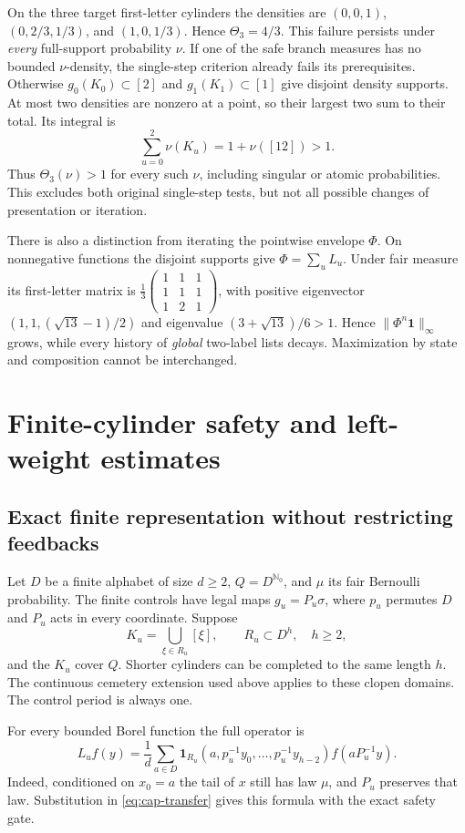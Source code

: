 \documentclass[11pt,reqno]{amsart}
\numberwithin{equation}{section}
\theoremstyle{definition}
\newcommand{\Nzero}{\mathbb N_0}
\newcommand{\one}{\mathbf 1}
\begin{document}
On the three target first-letter cylinders the densities are
$(0,0,1)$, $(0,2/3,1/3)$, and $(1,0,1/3)$.
Hence $\Theta_3=4/3$. This failure persists under \emph{every}
full-support probability $\nu$. If one of the safe branch measures
has no bounded $\nu$-density, the single-step criterion already
fails its prerequisites. Otherwise $g_0(K_0)\subset[2]$ and
$g_1(K_1)\subset[1]$ give disjoint density supports. At most two
densities are nonzero at a point, so their largest two sum to their
total. Its integral is
\[
 \sum_{u=0}^2\nu(K_u)=1+\nu([12])>1.
\]
Thus $\Theta_3(\nu)>1$ for every such $\nu$, including singular
or atomic probabilities. This excludes both original single-step
tests, but not all possible changes of presentation or iteration.

There is also a distinction from iterating the pointwise envelope
$\Phi$. On nonnegative functions the disjoint supports give
$\Phi=\sum_uL_u$. Under fair measure its first-letter matrix is
$\frac13\left(\begin{smallmatrix}1&1&1\\1&1&1\\1&2&1\end{smallmatrix}\right)$,
with positive eigenvector
$(1,1,(\sqrt{13}-1)/2)$ and eigenvalue
$(3+\sqrt{13})/6>1$. Hence $\|\Phi^n\one\|_\infty$ grows,
while every history of \emph{global} two-label lists decays.
Maximization by state and composition cannot be interchanged.


\section{Finite-cylinder safety and left-weight estimates}\label{sec:cylinder}

\subsection{Exact finite representation without restricting feedbacks}
Let $D$ be a finite alphabet of size $d\ge2$, $Q=D^{\Nzero}$,
and $\mu$ its fair Bernoulli probability. The finite controls have
legal maps $g_u=P_u\sigma$, where $p_u$ permutes $D$ and $P_u$
acts in every coordinate. Suppose
\[
 K_u=\bigcup_{\xi\in R_u}[\xi],\qquad R_u\subset D^h,
 \quad h\ge2,
\]
and the $K_u$ cover $Q$. Shorter cylinders can be completed to the
same length $h$. The continuous cemetery extension used above
applies to these clopen domains. The control period is always one.

For every bounded Borel function the full operator is
\begin{equation}\label{eq:cyl-operator}
 L_uf(y)=\frac1d\sum_{a\in D}
 \one_{R_u}(a,p_u^{-1}y_0,\ldots,p_u^{-1}y_{h-2})
 f(aP_u^{-1}y).
\end{equation}
Indeed, conditioned on $x_0=a$ the tail of $x$ still has law $\mu$,
and $P_u$ preserves that law. Substitution in
\eqref{eq:cap-transfer} gives this formula with the exact safety gate.
\end{document}
